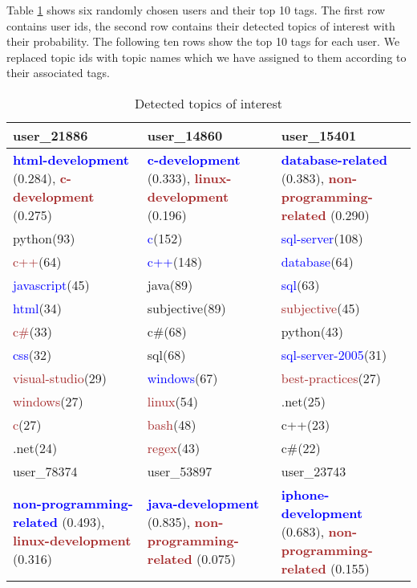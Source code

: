 Table \ref{tab:ldaresult2} shows six randomly chosen users and their top 10 tags. The first row contains user ids, the second row contains their detected topics of interest with their probability. The following ten rows show the top 10 tags for each user. We replaced topic ids with topic names which we have assigned to them according to their associated tags.
\begin{table}[htbp]
\tiny
\caption{Detected topics of interest}
\label{tab:ldaresult2}
\centering
\begin{tabular}{|p{60pt}|p{60pt}|p{60pt}|}
\hline
user\_21886&user\_14860&user\_15401\\
\hline
\textbf{\textcolor{blue}{html-development}} (0.284), \textbf{\textcolor{brown}{c-development}} (0.275)& \textbf{\textcolor{blue}{c-development}} (0.333), \textbf{\textcolor{brown}{linux-development}} (0.196)&\textbf{\textcolor{blue}{database-related}} (0.383), \textbf{\textcolor{brown}{non-programming-related}} (0.290)\\
\hline
python(93)&\textcolor{blue}{c}(152)&\textcolor{blue}{sql-server}(108)\\
\textcolor{brown}{c++}(64)&\textcolor{blue}{c++}(148)&\textcolor{blue}{database}(64)\\
\textcolor{blue}{javascript}(45)&java(89)&\textcolor{blue}{sql}(63)\\
\textcolor{blue}{html}(34)&subjective(89)&\textcolor{brown}{subjective}(45)\\
\textcolor{brown}{c\#}(33)&c\#(68)&python(43)\\
\textcolor{blue}{css}(32)&sql(68)&\textcolor{blue}{sql-server-2005}(31)\\
\textcolor{brown}{visual-studio}(29)&\textcolor{blue}{windows}(67)&\textcolor{brown}{best-practices}(27)\\
\textcolor{brown}{windows}(27)&\textcolor{brown}{linux}(54)&.net(25)\\
\textcolor{brown}{c}(27)&\textcolor{brown}{bash}(48)&c++(23)\\
.net(24)&\textcolor{brown}{regex}(43)&c\#(22)\\
\hline
\hline
user\_78374&user\_53897&user\_23743\\
\hline
\textbf{\textcolor{blue}{non-programming-related}} (0.493), \textbf{\textcolor{brown}{linux-development}} (0.316)&\textbf{\textcolor{blue}{java-development}} (0.835), \textbf{\textcolor{brown}{non-programming-related}} (0.075)&\textbf{\textcolor{blue}{iphone-development}} (0.683), \textbf{\textcolor{brown}{non-programming-related}} (0.155)\\

\end{tabular}
\end{table}
